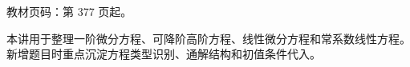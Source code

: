 
\begin{knowledgeBox}
教材页码：第 377 页起。

本讲用于整理一阶微分方程、可降阶高阶方程、线性微分方程和常系数线性方程。新增题目时重点沉淀方程类型识别、通解结构和初值条件代入。
\end{knowledgeBox}

